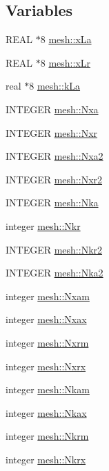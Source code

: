 \subsection*{Variables}
\begin{DoxyCompactItemize}
\item 
REAL $\ast$8 \hyperlink{namespacemesh_a7b0412308700e4488efc480ace9412b8}{mesh::xLa}
\item 
REAL $\ast$8 \hyperlink{namespacemesh_a4ad69b5cc7ea5c0bd0f1f8d39fc3f604}{mesh::xLr}
\item 
real $\ast$8 \hyperlink{namespacemesh_a9b60e77e26ab439594233774c928b35c}{mesh::kLa}
\item 
INTEGER \hyperlink{namespacemesh_ae1fae2c81e5dc8a2e00f92d4ccb24444}{mesh::Nxa}
\item 
INTEGER \hyperlink{namespacemesh_a4fae0f9e86bfdcb8fec5dc0aefd8fe71}{mesh::Nxr}
\item 
INTEGER \hyperlink{namespacemesh_a632597390bacfaae4c10d8cb907b2aec}{mesh::Nxa2}
\item 
INTEGER \hyperlink{namespacemesh_a7838433bd66eb8c9d5155928904d9a5a}{mesh::Nxr2}
\item 
INTEGER \hyperlink{namespacemesh_ab0bd6c4de110f0158d8a3aedd0be3907}{mesh::Nka}
\item 
integer \hyperlink{namespacemesh_a1d27552200f5f3bf302bcbd55bb2ccf5}{mesh::Nkr}
\item 
INTEGER \hyperlink{namespacemesh_a55a4e9bc46503b5f1fddde6e621a0b86}{mesh::Nkr2}
\item 
INTEGER \hyperlink{namespacemesh_abad69d3716a915fa710b7ba198f90f1b}{mesh::Nka2}
\item 
integer \hyperlink{namespacemesh_abe9e186636ba22271b7b4550522dceaf}{mesh::Nxam}
\item 
integer \hyperlink{namespacemesh_a258a6753e659f5aad4d77626f82c674c}{mesh::Nxax}
\item 
integer \hyperlink{namespacemesh_a3dc98a3a965cb38fc45c4b7801f0f3d2}{mesh::Nxrm}
\item 
integer \hyperlink{namespacemesh_a3836bb9dd0f99e784aecf5ffac36418a}{mesh::Nxrx}
\item 
integer \hyperlink{namespacemesh_a910970a3de4d93dbe22c5990a246c360}{mesh::Nkam}
\item 
integer \hyperlink{namespacemesh_a29b4b004a2f1961e2ad6ea8faf2bc447}{mesh::Nkax}
\item 
integer \hyperlink{namespacemesh_ac39a727e6167a944fb3c7997bfd11de4}{mesh::Nkrm}
\item 
integer \hyperlink{namespacemesh_a1750b1e7febac49c12606a9cbf2c4ac2}{mesh::Nkrx}

\end{DoxyCompactItemize}
